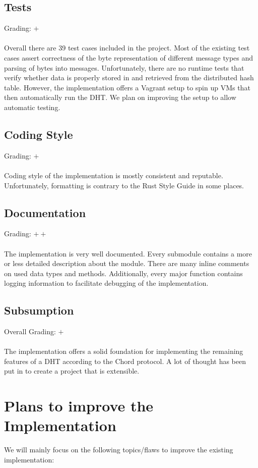 \documentclass[a4paper, 11pt]{article}
\begin{document}
\subsection*{Tests}
Grading: $+$\\
\\
Overall there are 39 test cases included in the project.
Most of the existing test cases assert correctness of the byte representation of different message types and parsing of bytes into messages.
Unfortunately, there are no runtime tests that verify whether data is properly stored in and retrieved from the distributed hash table.
However, the implementation offers a Vagrant setup to spin up VMs that then automatically run the DHT.
We plan on improving the setup to allow automatic testing.

\subsection*{Coding Style}
Grading: $+$\\
\\
Coding style of the implementation is mostly consistent and reputable.
Unfortunately, formatting is contrary to the Rust Style Guide \cite{RustStyleGuide} in some places.


\subsection*{Documentation}
Grading: $++$\\
\\
The implementation is very well documented.
Every submodule contains a more or less detailed description about the module.
There are many inline comments on used data types and methods.
Additionally, every major function contains logging information to facilitate debugging of the implementation.


\subsection*{Subsumption}
Overall Grading: $+$\\
\\
The implementation offers a solid foundation for implementing the remaining features of a DHT according to the Chord protocol. 
A lot of thought has been put in to create a project that is extensible.

\section*{Plans to improve the Implementation}
We will mainly focus on the following topics/flaws to improve the existing implementation:
\end{document}
